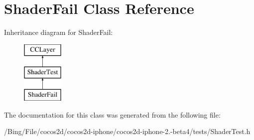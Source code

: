\hypertarget{interface_shader_fail}{\section{Shader\-Fail Class Reference}
\label{interface_shader_fail}
}
Inheritance diagram for Shader\-Fail\-:\begin{figure}[H]
\begin{center}
\leavevmode
\includegraphics[height=3.000000cm]{interface_shader_fail}
\end{center}
\end{figure}


The documentation for this class was generated from the following file\-:\begin{DoxyCompactItemize}
\item 
/\-Bing/\-File/cocos2d/cocos2d-\/iphone/cocos2d-\/iphone-\/2.-\/beta4/tests/Shader\-Test.\-h\end{DoxyCompactItemize}
